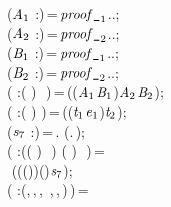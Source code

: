 \begin{holmath}
\,\,\,(\ensuremath{\HOLBoundVar{A}\sb{\mathrm{1}}} :)\,=\,\ensuremath{\HOLBoundVar{proof\HOLTokenUnderscore{}}\sb{\mathrm{1}}}..;\\
\,\,\,(\ensuremath{\HOLBoundVar{A}\sb{\mathrm{2}}} :)\,=\,\ensuremath{\HOLBoundVar{proof\HOLTokenUnderscore{}}\sb{\mathrm{2}}}..;\\
\,\,\,(\ensuremath{\HOLBoundVar{B}\sb{\mathrm{1}}} :)\,=\,\ensuremath{\HOLBoundVar{proof\HOLTokenUnderscore{}}\sb{\mathrm{1}}}..;\\
\,\,\,(\ensuremath{\HOLBoundVar{B}\sb{\mathrm{2}}} :)\,=\,\ensuremath{\HOLBoundVar{proof\HOLTokenUnderscore{}}\sb{\mathrm{2}}}..;\\
\,\,\,( :(\,\HOLTokenProd{}\,)\,\HOLTokenProd{}\,\,\HOLTokenProd{}\,)\,=\,((\ensuremath{\HOLBoundVar{A}\sb{\mathrm{1}}}\HOLSymConst{,}\ensuremath{\HOLBoundVar{B}\sb{\mathrm{1}}})\HOLSymConst{,}\ensuremath{\HOLBoundVar{A}\sb{\mathrm{2}}}\HOLSymConst{,}\ensuremath{\HOLBoundVar{B}\sb{\mathrm{2}}});\\
\,\,\,( :(\,\HOLTokenProd{}\,)\,\HOLTokenProd{}\,)\,=\,((\ensuremath{\HOLBoundVar{t}\sb{\mathrm{1}}}\HOLSymConst{,}\ensuremath{\HOLBoundVar{e}\sb{\mathrm{1}}})\HOLSymConst{,}\ensuremath{\HOLBoundVar{t}\sb{\mathrm{2}}});\\
\,\,\,(\ensuremath{\HOLBoundVar{s}\sb{\mathrm{7}}} :)\,=\,.\,\HOLBoundVar{\ensuremath{\beta}}\,(.\,);\\
\,\,\,( :((\,\HOLTokenProd{}\,)\,\HOLTokenProd{}\,\,\HOLTokenProd{}\,)\,\HOLTokenProd{}\,(\,\HOLTokenProd{}\,)\,\HOLTokenProd{}\,\,\HOLTokenProd{}\,)\,=\\
\,\,\,\,\,(((\HOLSymConst{,}\HOLBoundVar{\ensuremath{\alpha}})\HOLSymConst{,}\HOLSymConst{,}\HOLBoundVar{\ensuremath{\beta}})\HOLSymConst{,}(\HOLSymConst{,}\HOLBoundVar{\ensuremath{\alpha}})\HOLSymConst{,}\HOLSymConst{,}\ensuremath{\HOLBoundVar{s}\sb{\mathrm{7}}});\\
\,\,\,( :(,\,,\,,\,\,\HOLTokenProd{}\,,\,,\,)\,)\,=\\

\end{holmath}
